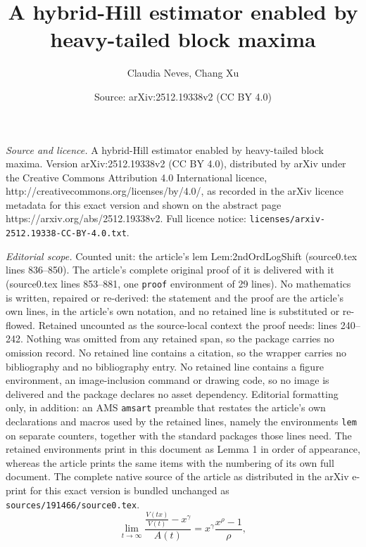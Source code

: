 \documentclass[10pt,a4paper]{amsart}
\title{A hybrid-Hill estimator enabled by heavy-tailed block maxima}
\author{Claudia Neves, Chang Xu}
\date{Source: arXiv:2512.19338v2 (CC BY 4.0)}
\newcommand{\limit}[1]{\ensuremath{\displaystyle {\lim_{#1 \rightarrow{\infty}}}}}
\begin{document}
\maketitle

\noindent\emph{Source and licence.} A hybrid-Hill estimator enabled by heavy-tailed block maxima. Version arXiv:2512.19338v2 (CC BY 4.0), distributed by arXiv under the Creative Commons Attribution 4.0 International licence, http://creativecommons.org/licenses/by/4.0/, as recorded in the arXiv licence metadata for this exact version and shown on the abstract page https://arxiv.org/abs/2512.19338v2. Full licence notice: \texttt{licenses/arxiv-2512.19338-CC-BY-4.0.txt}.\par\smallskip

\noindent\textit{Editorial scope.} Counted unit: the article's lem Lem:2ndOrdLogShift (source0.tex lines 836--850). The article's complete original proof of it is delivered with it (source0.tex lines 853--881, one \texttt{proof} environment of 29 lines). No mathematics is written, repaired or re-derived: the statement and the proof are the article's own lines, in the article's own notation, and no retained line is substituted or re-flowed.  Retained uncounted as the source-local context the proof needs: lines 240--242.  Nothing was omitted from any retained span, so the package carries no omission record.  No retained line contains a citation, so the wrapper carries no bibliography and no bibliography entry.  No retained line contains a figure environment, an image-inclusion command or drawing code, so no image is delivered and the package declares no asset dependency.  Editorial formatting only, in addition: an AMS \texttt{amsart} preamble that restates the article's own declarations and macros used by the retained lines, namely the environments \texttt{lem} on separate counters, together with the standard packages those lines need.  The retained environments print in this document as Lemma 1 in order of appearance, whereas the article prints the same items with the numbering of its own full document.  The complete native source of the article as distributed in the arXiv e-print for this exact version is bundled unchanged as \texttt{sources/191466/source0.tex}.
\begin{equation}\label{eq:2ndRVofV}
     \limit{t}\frac{\frac{V(tx)}{V(t)}-x^{\gamma}}{A(t)}=x^{{\gamma}}\frac{x^{\rho}-1}{\rho},
    \end{equation}
\end{document}
